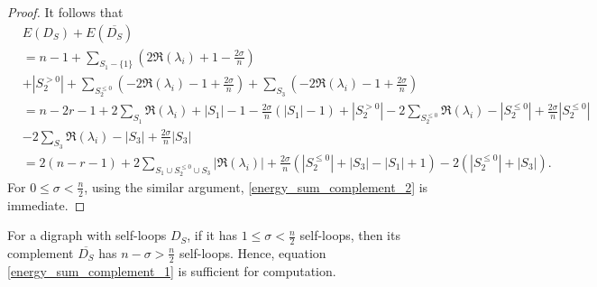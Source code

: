 \documentclass[12pt,a4paper,reqno]{amsart}
\numberwithin{equation}{section}
\theoremstyle{plain}
\theoremstyle{definition}
\newcommand{\<}{\langle}
\renewcommand{\>}{\rangle}
\begin{document}
\begin{proof}
    It follows that 
    \begin{align*}
        &E(D_S)+E(\overline{D_S}) \\
        &= n-1+ \sum_{S_1-\{1\}}  \left( 2\Re(\lambda_i)+1-\frac{2\sigma}{n} \right)\\
        &+|S_2^{>0}|+ \sum_{S_2^{\leq 0}} \left( -2\Re(\lambda_i)-1+\frac{2\sigma}{n} \right) + \sum_{S_3} \left(-2\Re(\lambda_i)-1+\frac{2\sigma}{n} \right)\\
        &= n-2r-1+2\sum_{S_1}\Re(\lambda_i)+|S_1|-1- \frac{2\sigma}{n} \left( |S_1|-1 \right)+|S_2^{>0}| - 2\sum_{S_2^{\leq 0}}\Re(\lambda_i)-|S_2^{\leq 0}|+\frac{2\sigma}{n}|S_2^{\leq 0}| \\
        &-2\sum_{S_3} \Re(\lambda_i)-|S_3|+\frac{2\sigma}{n}|S_3|\\
        &=2(n-r-1)+2\sum_{S_1 \cup S_2^{\leq 0} \cup S_3 }|\Re(\lambda_i)|+\frac{2\sigma}{n}(|S_2^{\leq 0}|+|S_3|-|S_1|+1) -2(|S_2^{\leq 0}|+|S_3|).
    \end{align*}
    For $0\leq \sigma < \frac{n}{2}$, using the similar argument, \eqref{energy_sum_complement_2} is immediate.
    \end{proof}
    
    For a digraph with self-loops $D_S$, if it has  $1\leq \sigma<\frac{n}{2}$ self-loops, then its complement $\overline{D_S}$ has $n-\sigma > \frac{n}{2}$ self-loops. Hence, equation \eqref{energy_sum_complement_1} is sufficient for computation.
\end{document}
